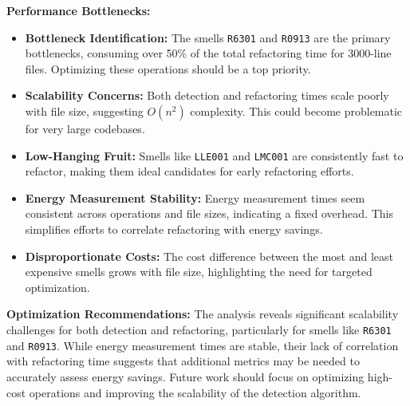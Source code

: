\documentclass[12pt, titlepage]{article}
\begin{document}
\noindent \textbf{Performance Bottlenecks:}
\begin{itemize}
  \item \textbf{Bottleneck Identification:} The smells \texttt{R6301}
    and \texttt{R0913} are the primary bottlenecks, consuming over
    50\% of the total refactoring time for 3000-line files.
    Optimizing these operations should be a top priority.
  \item \textbf{Scalability Concerns:} Both detection and refactoring
    times scale poorly with file size, suggesting \(O(n^2)\)
    complexity. This could become problematic for very large codebases.
  \item \textbf{Low-Hanging Fruit:} Smells like \texttt{LLE001} and
    \texttt{LMC001} are consistently fast to refactor, making them
    ideal candidates for early refactoring efforts.
  \item \textbf{Energy Measurement Stability:} Energy measurement
    times seem consistent across operations and file sizes,
    indicating a fixed overhead. This simplifies efforts to correlate
    refactoring with energy savings.
  \item \textbf{Disproportionate Costs:} The cost difference between
    the most and least expensive smells grows with file size,
    highlighting the need for targeted optimization.
\end{itemize}

\noindent \textbf{Optimization Recommendations:}
The analysis reveals significant scalability challenges for both
detection and refactoring, particularly for smells like
\texttt{R6301} and \texttt{R0913}. While energy measurement times are
stable, their lack of correlation with refactoring time suggests that
additional metrics may be needed to accurately assess energy savings.
Future work should focus on optimizing high-cost operations and
improving the scalability of the detection algorithm.
\end{document}
